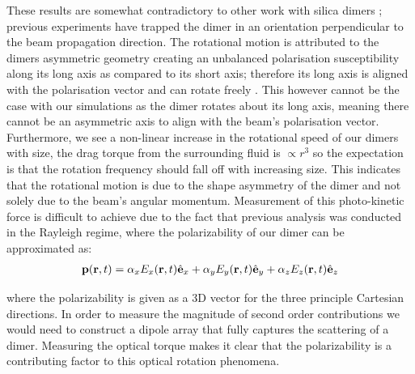 These results are somewhat contradictory to other work with silica dimers
\cite{Ahn2018, Debuysschere2023,Reimann2018}; previous experiments
have trapped the dimer in an orientation perpendicular to the beam
propagation direction. The rotational motion is attributed to the
dimers asymmetric geometry creating an unbalanced polarisation susceptibility
along its long axis as compared to its short axis; therefore its long
axis is aligned with the polarisation vector and can rotate
freely \cite{Ahn2018}. This however cannot be the case with our
simulations as the dimer rotates about its long axis, meaning there
cannot be an asymmetric axis to align with the beam's polarisation
vector. Furthermore, we see a non-linear increase in the rotational
speed of our dimers with size, the drag torque from the surrounding
fluid is $\propto r^3$ so the expectation is that the rotation
frequency should fall off with increasing size. This indicates that
the rotational motion is due to the shape asymmetry of the dimer and
not solely due to the beam's angular momentum. Measurement of this
photo-kinetic force is difficult to achieve due to the fact that
previous analysis was conducted in the Rayleigh regime, where the
polarizability of our dimer can be approximated as:
\begin{align}
  \bold{p}({\bf r},t)
  =
  \alpha_x E_x({\bf r},t)\hat{\bf e}_x
  + \alpha_yE_y({\bf r},t)\hat{\bf e}_y
  + \alpha_zE_z({\bf r},t)\hat{\bf e}_z
\end{align}

where the polarizability is given as a 3D vector for the three
principle Cartesian directions. In order to measure the magnitude of
second order contributions we would need to construct a dipole array
that fully captures the scattering of a dimer. Measuring the optical 
torque makes it clear that the polarizability is a contributing factor 
to this optical rotation phenomena. 

